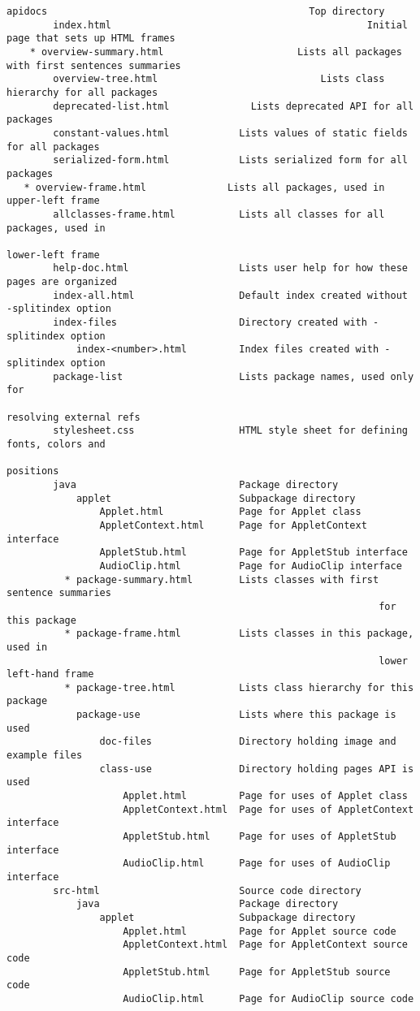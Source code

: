 \begin{lstlisting}[caption=Struktur {\it file} yang dihasilkan]
	apidocs						  			  		    Top directory
		index.html											  Initial page that sets up HTML frames
	* overview-summary.html 					  Lists all packages with first sentences summaries
		overview-tree.html							  Lists class hierarchy for all packages
		deprecated-list.html              Lists deprecated API for all packages
   		constant-values.html            Lists values of static fields for all packages
   		serialized-form.html            Lists serialized form for all packages
   * overview-frame.html              Lists all packages, used in upper-left frame
   		allclasses-frame.html           Lists all classes for all packages, used in
   																		lower-left frame
   		help-doc.html                   Lists user help for how these pages are organized
   		index-all.html                  Default index created without -splitindex option
   		index-files                     Directory created with -splitindex option
       		index-<number>.html         Index files created with -splitindex option
   		package-list                    Lists package names, used only for 
   																		resolving external refs
   		stylesheet.css                  HTML style sheet for defining fonts, colors and
   																		positions
   		java                            Package directory
       		applet                      Subpackage directory
            	Applet.html             Page for Applet class
            	AppletContext.html      Page for AppletContext interface
            	AppletStub.html         Page for AppletStub interface
            	AudioClip.html          Page for AudioClip interface
          * package-summary.html    	Lists classes with first sentence summaries
          														for this package
          * package-frame.html      	Lists classes in this package, used in
          														lower left-hand frame
          * package-tree.html       	Lists class hierarchy for this package
            package-use             	Lists where this package is used
            	doc-files               Directory holding image and example files
            	class-use               Directory holding pages API is used
                	Applet.html         Page for uses of Applet class
                	AppletContext.html  Page for uses of AppletContext interface
                	AppletStub.html     Page for uses of AppletStub interface
                	AudioClip.html      Page for uses of AudioClip interface
   		src-html                        Source code directory
       		java                        Package directory
           		applet                  Subpackage directory
                	Applet.html         Page for Applet source code
                	AppletContext.html  Page for AppletContext source code
                	AppletStub.html     Page for AppletStub source code
                	AudioClip.html      Page for AudioClip source code
\end{lstlisting}
